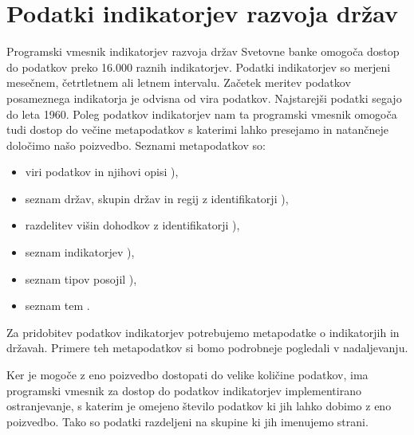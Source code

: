 \section{Podatki indikatorjev razvoja držav}
\label{sec:podatki_ind_razvoja}



Programski vmesnik indikatorjev razvoja držav Svetovne banke omogoča dostop
do podatkov preko 16.000 raznih indikatorjev. Podatki indikatorjev so merjeni
mesečnem, četrtletnem ali letnem intervalu. Začetek meritev podatkov
posameznega indikatorja je odvisna od vira podatkov. Najstarejši podatki segajo
do leta 1960. Poleg podatkov indikatorjev nam ta programski vmesnik omogoča 
tudi dostop do večine metapodatkov s katerimi lahko presejamo in natančneje
določimo našo poizvedbo. Seznami metapodatkov so:
\begin{itemize}
\item viri podatkov in njihovi opisi 
	),
\item seznam držav, skupin držav in regij z identifikatorji 
	),
\item razdelitev višin dohodkov z identifikatorji 
	),
\item seznam indikatorjev 
  ),
\item seznam tipov posojil 
	),
\item seznam tem .
\end{itemize}

Za pridobitev podatkov indikatorjev potrebujemo metapodatke o indikatorjih in
državah. Primere teh metapodatkov si bomo podrobneje pogledali v nadaljevanju.

Ker je mogoče z eno poizvedbo dostopati do velike količine podatkov, ima
programski vmesnik za dostop do podatkov indikatorjev implementirano
ostranjevanje, s katerim je omejeno število podatkov ki jih lahko dobimo z eno
poizvedbo. Tako so podatki razdeljeni na skupine ki jih imenujemo strani.

